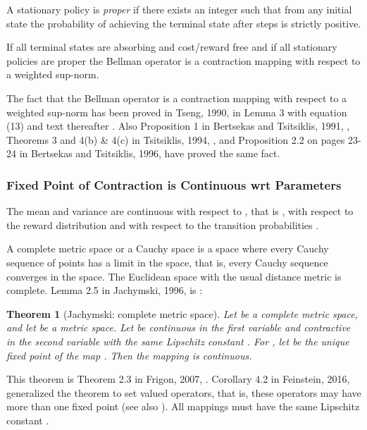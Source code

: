 \documentclass{article}
\newtheorem{theoremA}{Theorem}
\begin{document}
\begin{appendices}
A stationary policy is {\em proper} if there exists an integer 
such that from any initial state  the probability of achieving
the terminal state after  steps is strictly positive.

If all terminal states are absorbing and cost/reward free and
if all stationary policies are proper the Bellman operator is a contraction
mapping with respect to a weighted sup-norm.

The fact that the Bellman operator is a contraction
mapping with respect to a weighted sup-norm
has been proved in Tseng, 1990, in Lemma 3 with equation (13) and
text thereafter \cite{Tseng:90Journal}. Also Proposition 1
in Bertsekas and Tsitsiklis, 1991, \cite{Bertsekas:91},
Theorems 3 and 4(b) \& 4(c) in Tsitsiklis, 1994, \cite{Tsitsiklis:94},
and Proposition 2.2 on pages 23-24 in
Bertsekas and Tsitsiklis, 1996, \cite{Bertsekas:96} have proved
the same fact.


\subsubsection{Fixed Point of Contraction is Continuous wrt Parameters}
\label{sec:ApropPolyFPcon}


The mean   and variance  are continuous with respect to , that is
, with
respect to the reward distribution  and with respect to
the transition probabilities . 

A complete metric space or a Cauchy space is a space where every
Cauchy sequence of points has a limit in the space, that is,
every Cauchy sequence converges in the space.
The Euclidean space   with the usual distance metric is complete.
Lemma 2.5 in Jachymski, 1996, is \cite{Jachymski:96}:
\begin{theoremA}[Jachymski: complete metric space]
Let  be a complete metric space, and let  be a
metric space. Let 
be continuous in the first variable and
contractive in the second variable with the same Lipschitz constant
. For
, let 
be the unique fixed point of the map . Then the
mapping  is continuous.
\end{theoremA}
This theorem is Theorem 2.3 in Frigon, 2007,  \cite{Frigon:07}.
Corollary 4.2 in Feinstein, 2016, generalized the theorem
to set valued operators, that is, these operators may have
more than one fixed point \cite{Feinstein:16}
(see also \cite{Kirr:97}).
All mappings  must have the same Lipschitz constant
.



\end{appendices}
\end{document}
